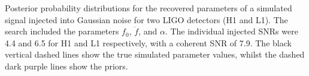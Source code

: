\label{fig:ffdot_inj1}
Posterior probability distributions for the recovered parameters of a simulated signal injected into Gaussian
noise for two LIGO detectors (H1 and L1). The search included the parameters $f_0$, $\dot{f}$, and $\alpha$. The
individual injected SNRs were 4.4 and 6.5 for H1 and L1 respectively, with a coherent SNR of 7.9. The black
vertical dashed lines show the true simulated parameter values, whilst the dashed dark purple lines show the
priors.
